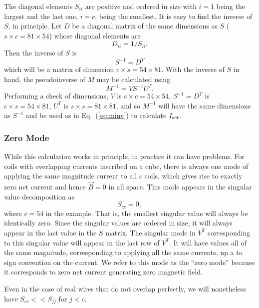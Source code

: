 \documentclass[preprint,12pt]{elsarticle}
\begin{document}
The diagonal elements $S_{ii}$ are positive and ordered in size with
$i=1$ being the largest and the last one, $i=c$, being the smallest.
It is easy to find the inverse of $S$, in principle.  Let $D$ be a
diagonal matrix of the same dimensions as $S$ ($s\times c=81\times
54$) whose diagonal elements are
\begin{equation}
  D_{ii}=1/S_{ii}.
\end{equation}
Then the inverse of $S$ is
\begin{equation}
  S^{-1}=D^T
\end{equation}
which will be a matrix of dimension $c\times s=54\times 81$.  With the
inverse of $S$ in hand, the pseudoinverse of $M$ may be calculated using
\begin{equation}
  M^{-1}=VS^{-1}U^T.
\end{equation}
Performing a check of dimensions, $V$ is $c\times c=54\times 54$,
$S^{-1}=D^T$ is $c\times s=54\times 81$, $U^T$ is $s\times s=81\times
81$, and so $M^{-1}$ will have the same dimensions as $S^{-1}$ and be
used as in Eq.~(\ref{eq:minv}) to calculate $I_{\rm set}$.

\subsubsection{Zero Mode}

While this calculation works in principle, in practice it can have
problems.  For coils with overlapping currents inscribed on a cube,
there is always one mode of applying the same magnitude current to all
$c$ coils, which gives rise to exactly zero net current and hence
$\vec{B}=0$ in all space.  This mode appears in the singular value
decomposition as
\begin{equation}
  S_{cc}=0,
\end{equation}
where $c=54$ in the example.  That is, the smallest singular value
will always be identically zero.  Since the singular values are
ordered in size, it will always appear in the last value in the $S$
matrix.  The singular mode in $V^T$ corresponding to this singular
value will appear in the last row of $V^T$.  It will have values all
of the same magnitude, corresponding to applying all the same
currents, up a to sign convention on the current.  We refer to this
mode as the ``zero mode'' because it corresponds to zero net current
generating zero magnetic field.

Even in the case of real wires that do not overlap perfectly, we will
nonetheless have $S_{cc}<<S_{jj}$ for $j<c$.
\end{document}
